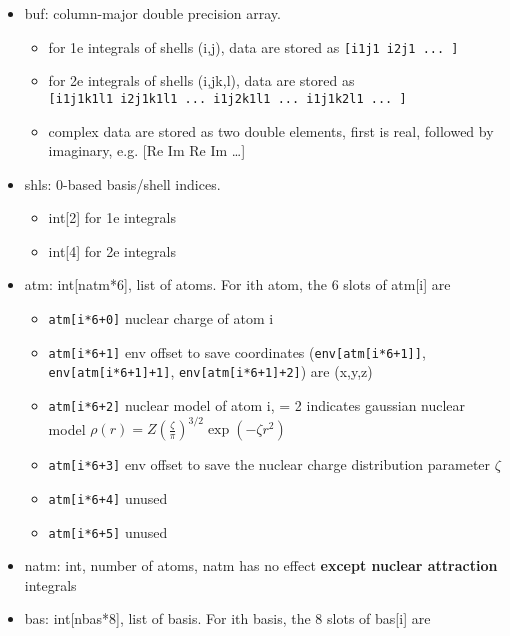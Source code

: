 \documentclass[]{article}
\begin{document}
\begin{itemize}
\itemsep1pt\parskip0pt
\item
  buf: column-major double precision array.

  \begin{itemize}
  \itemsep1pt\parskip0pt
  \item
    for 1e integrals of shells (i,j), data are stored as
    \texttt{{[}i1j1 i2j1 ... {]}}
  \item
    for 2e integrals of shells (i,j\textbar{}k,l), data are stored as\\
    \texttt{{[}i1j1k1l1 i2j1k1l1 ... i1j2k1l1 ... i1j1k2l1 ... {]}}
  \item
    complex data are stored as two double elements, first is real,
    followed by imaginary, e.g. {[}Re Im Re Im \ldots{}{]}
  \end{itemize}
\item
  shls: 0-based basis/shell indices.

  \begin{itemize}
  \itemsep1pt\parskip0pt
  \item
    int{[}2{]} for 1e integrals
  \item
    int{[}4{]} for 2e integrals
  \end{itemize}
\item
  atm: int{[}natm*6{]}, list of atoms. For ith atom, the 6 slots of
  atm{[}i{]} are

  \begin{itemize}
  \itemsep1pt\parskip0pt
  \item
    \texttt{atm{[}i*6+0{]}} nuclear charge of atom i
  \item
    \texttt{atm{[}i*6+1{]}} env offset to save coordinates
    (\texttt{env{[}atm{[}i*6+1{]}{]}},
    \texttt{env{[}atm{[}i*6+1{]}+1{]}},
    \texttt{env{[}atm{[}i*6+1{]}+2{]}}) are (x,y,z)
  \item
    \texttt{atm{[}i*6+2{]}} nuclear model of atom i, = 2 indicates
    gaussian nuclear model
    $\rho(r) = Z (\frac{\zeta}{\pi})^{3/2} \exp(-\zeta r^2)$
  \item
    \texttt{atm{[}i*6+3{]}} env offset to save the nuclear charge
    distribution parameter $\zeta$
  \item
    \texttt{atm{[}i*6+4{]}} unused
  \item
    \texttt{atm{[}i*6+5{]}} unused
  \end{itemize}
\item
  natm: int, number of atoms, natm has no effect \textbf{except nuclear
  attraction} integrals
\item
  bas: int{[}nbas*8{]}, list of basis. For ith basis, the 8 slots of
  bas{[}i{]} are


\end{itemize}
\end{document}
